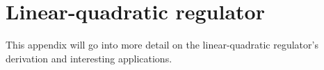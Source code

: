 
\chapter{Linear-quadratic regulator}
\label{ch:deriv_lqr}

This appendix will go into more detail on the linear-quadratic regulator's
derivation and interesting applications.

\renewcommand*{\chapterpath}{\partpath/linear-quadratic-regulator}




